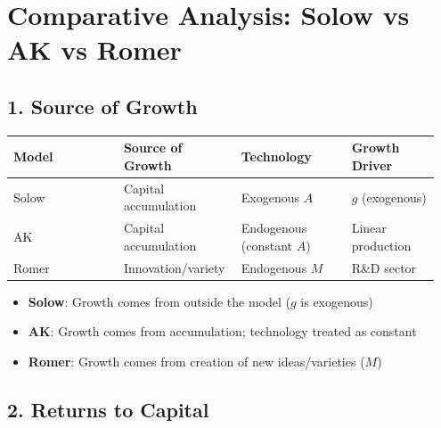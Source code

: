 
\section{Comparative Analysis: Solow vs AK vs Romer}

\subsection*{1. Source of Growth}

\begin{tabular}{p{0.25\linewidth}p{0.25\linewidth}p{0.25\linewidth}p{0.2\linewidth}}
\toprule
\textbf{Model} & \textbf{Source of Growth} & \textbf{Technology} & \textbf{Growth Driver} \\
\midrule
Solow & Capital accumulation & Exogenous $A$ & $g$ (exogenous) \\
AK & Capital accumulation & Endogenous (constant $A$) & Linear production \\
Romer & Innovation/variety & Endogenous $M$ & R\&D sector \\
\bottomrule
\end{tabular}

\bigskip
\begin{tcolorbox}[colback=blue!5,colframe=blue3,title=Key Insight]
\begin{itemize}
    \item \textbf{Solow}: Growth comes from outside the model ($g$ is exogenous)
    \item \textbf{AK}: Growth comes from accumulation; technology treated as constant
    \item \textbf{Romer}: Growth comes from creation of new ideas/varieties ($M$)
\end{itemize}
\end{tcolorbox}

\subsection*{2. Returns to Capital}

